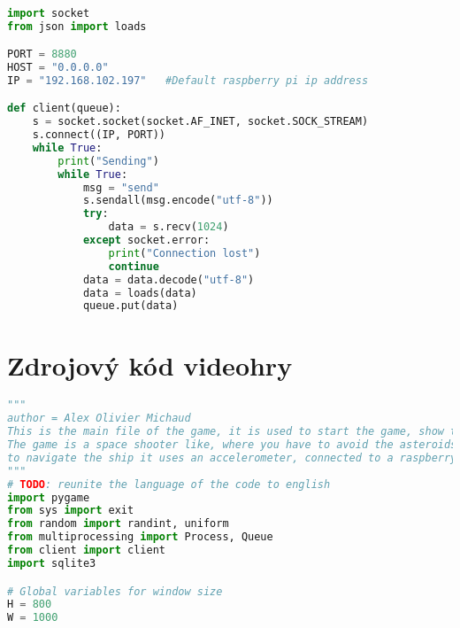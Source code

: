 \documentclass[12pt]{report}			%
\begin{document}
\begin{appendices}
\begin{lstlisting}[title={Program client.py}, caption={client.py},  label={lst:client}, language=Python]

import socket
from json import loads

PORT = 8880
HOST = "0.0.0.0"
IP = "192.168.102.197"   #Default raspberry pi ip address

def client(queue):
    s = socket.socket(socket.AF_INET, socket.SOCK_STREAM)
    s.connect((IP, PORT))
    while True:
        print("Sending")
        while True:
            msg = "send"
            s.sendall(msg.encode("utf-8"))
            try:
                data = s.recv(1024)
            except socket.error:
                print("Connection lost")
                continue
            data = data.decode("utf-8")
            data = loads(data)
            queue.put(data)

\end{lstlisting}
	\chapter{Zdrojový kód videohry}
	
\begin{lstlisting}[title={Program hra.py}, caption={hra.py},  label={lst:hra}, language=Python]
"""
author = Alex Olivier Michaud
This is the main file of the game, it is used to start the game, show the score and exit the game.
The game is a space shooter like, where you have to avoid the asteroids
to navigate the ship it uses an accelerometer, connected to a raspberry pi
"""
# TODO: reunite the language of the code to english
import pygame
from sys import exit
from random import randint, uniform
from multiprocessing import Process, Queue
from client import client
import sqlite3

# Global variables for window size
H = 800
W = 1000


\end{lstlisting}
\end{appendices}
\end{document}
